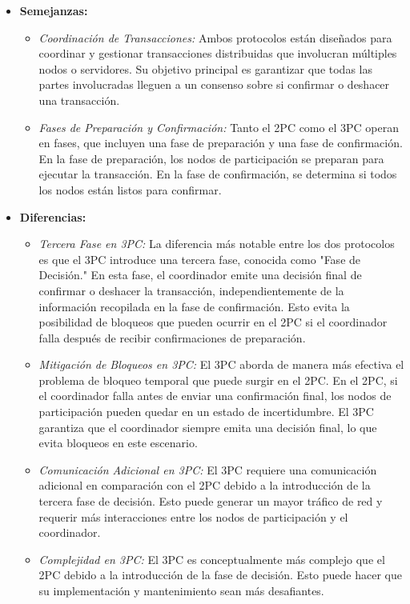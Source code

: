\begin{itemize}
	\item \textbf{Semejanzas:}
	\begin{itemize}
		\item \textit{Coordinación de Transacciones:} Ambos protocolos están diseñados para coordinar y gestionar transacciones distribuidas que involucran múltiples nodos o servidores. Su objetivo principal es garantizar que todas las partes involucradas lleguen a un consenso sobre si confirmar o deshacer una transacción.
		\item \textit{Fases de Preparación y Confirmación:} Tanto el 2PC como el 3PC operan en fases, que incluyen una fase de preparación y una fase de confirmación. En la fase de preparación, los nodos de participación se preparan para ejecutar la transacción. En la fase de confirmación, se determina si todos los nodos están listos para confirmar.
	\end{itemize}
	
	\item \textbf{Diferencias:}
	\begin{itemize}
		\item \textit{Tercera Fase en 3PC:} La diferencia más notable entre los dos protocolos es que el 3PC introduce una tercera fase, conocida como "Fase de Decisión." En esta fase, el coordinador emite una decisión final de confirmar o deshacer la transacción, independientemente de la información recopilada en la fase de confirmación. Esto evita la posibilidad de bloqueos que pueden ocurrir en el 2PC si el coordinador falla después de recibir confirmaciones de preparación.
		\item \textit{Mitigación de Bloqueos en 3PC:} El 3PC aborda de manera más efectiva el problema de bloqueo temporal que puede surgir en el 2PC. En el 2PC, si el coordinador falla antes de enviar una confirmación final, los nodos de participación pueden quedar en un estado de incertidumbre. El 3PC garantiza que el coordinador siempre emita una decisión final, lo que evita bloqueos en este escenario.
		\item \textit{Comunicación Adicional en 3PC:} El 3PC requiere una comunicación adicional en comparación con el 2PC debido a la introducción de la tercera fase de decisión. Esto puede generar un mayor tráfico de red y requerir más interacciones entre los nodos de participación y el coordinador.
		\item \textit{Complejidad en 3PC:} El 3PC es conceptualmente más complejo que el 2PC debido a la introducción de la fase de decisión. Esto puede hacer que su implementación y mantenimiento sean más desafiantes.
	\end{itemize}
\end{itemize}

